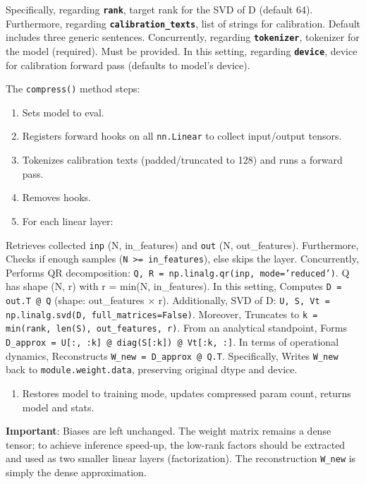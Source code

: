 Specifically, regarding \textbf{\texttt{rank}}, target rank for the SVD of D (default 64). Furthermore, regarding \textbf{\texttt{calibration\_texts}}, list of strings for calibration. Default includes three generic sentences. Concurrently, regarding \textbf{\texttt{tokenizer}}, tokenizer for the model (required). Must be provided. In this setting, regarding \textbf{\texttt{device}}, device for calibration forward pass (defaults to model's device).


The \texttt{compress()} method steps:

\begin{enumerate}
\item Sets model to eval.
\item Registers forward hooks on all \texttt{nn.Linear} to collect input/output tensors.
\item Tokenizes calibration texts (padded/truncated to 128) and runs a forward pass.
\item Removes hooks.
\item For each linear layer:
\end{enumerate}
Retrieves collected \texttt{inp} (N, in\_features) and \texttt{out} (N, out\_features). Furthermore, Checks if enough samples (\texttt{N >= in\_features}), else skips the layer. Concurrently, Performs QR decomposition: \texttt{Q, R = np.linalg.qr(inp, mode='reduced')}. Q has shape (N, r) with r = min(N, in\_features). In this setting, Computes \texttt{D = out.T @ Q} (shape: out\_features $\times$ r). Additionally, SVD of D: \texttt{U, S, Vt = np.linalg.svd(D, full\_matrices=False)}. Moreover, Truncates to \texttt{k = min(rank, len(S), out\_features, r)}. From an analytical standpoint, Forms \texttt{D\_approx = U[:, :k] @ diag(S[:k]) @ Vt[:k, :]}. In terms of operational dynamics, Reconstructs \texttt{W\_new = D\_approx @ Q.T}. Specifically, Writes \texttt{W\_new} back to \texttt{module.weight.data}, preserving original dtype and device.

\begin{enumerate}
\item Restores model to training mode, updates compressed param count, returns model and stats.

\end{enumerate}
\textbf{Important}: Biases are left unchanged. The weight matrix remains a dense tensor; to achieve inference speed-up, the low-rank factors should be extracted and used as two smaller linear layers (factorization). The reconstruction \texttt{W\_new} is simply the dense approximation.

